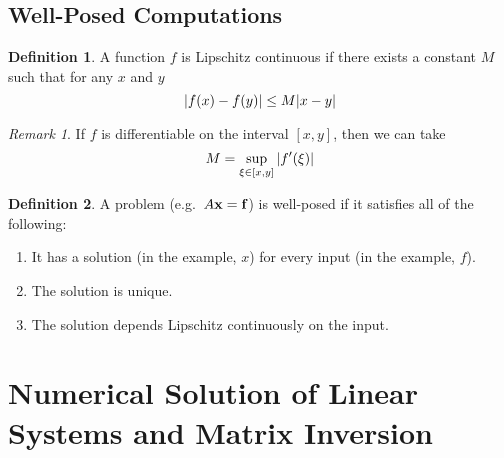 \documentclass[11pt,letterpaper]{article}
\numberwithin{figure}{section} %
\newcommand{\keyword}[1]{\colorbox{cyan!20!}{#1}}
\theoremstyle{definition}
\theoremstyle{definition}
\theoremstyle{definition}
\theoremstyle{definition}
\newtheorem{definition}{Definition}[subsection]
\theoremstyle{definition}
\theoremstyle{remark}
\newtheorem*{remark}{Remark}
\theoremstyle{remark}
\theoremstyle{definition}
\theoremstyle{remark}
\theoremstyle{remark}
\begin{document}
\begin{multicols*}{3}
\subsection{Well-Posed Computations}
\begin{definition}
	A function $f$ is \keyword{Lipschitz continuous} if there exists
	a constant $M$ such that for any $x$ and $y$
	\[
		\abs{f(x) - f(y)} \leq M\abs{x - y}
	\]
\end{definition}
\begin{remark}
	If $f$ is differentiable on the interval $[x,y]$, then we can take
	\[
		M = \sup_{\xi \in [x, y]} \abs{f'(\xi)}
	\]
\end{remark}
\begin{definition}
	A problem (e.g.\ $A\vb{x} = \vb{f}$) is \keyword{well-posed} if it satisfies
	all of the following:
	\begin{enumerate}[label={(\alph*)}]
		\item It has a solution (in the example, $x$) for every input (in the
			example, $f$).
		\item The solution is unique.
		\item The solution depends Lipschitz continuously on the input.

	\end{enumerate}
\end{definition}
\section{Numerical Solution of Linear Systems and Matrix Inversion}

\end{multicols*}
\end{document}

